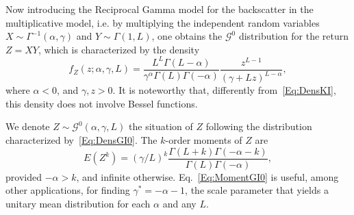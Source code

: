 \documentclass{beamer}
\begin{document}
\begin{frame}
Now introducing the Reciprocal Gamma model for the backscatter in the multiplicative model, i.e. by multiplying the independent random variables $X\sim{\Gamma^{-1}}(\alpha,\gamma)$ and $Y\sim\Gamma(1,L)$, one obtains the $\mathcal{G}^0$ distribution for the return $Z=XY$, which is characterized by the density
\begin{equation}
f_Z(z; \alpha,\gamma,L) = \frac{L^L \Gamma(L-\alpha)}{\gamma^\alpha \Gamma(L)\Gamma(-\alpha)} \frac{z^{L-1}}{(\gamma+L z)^{L-\alpha}},
\label{Eq:DensGI0}
\end{equation}
where $\alpha<0$, and $\gamma,z>0$.
It is noteworthy that, differently from~\eqref{Eq:DensKI}, this density does not involve Bessel functions.

We denote $Z\sim \mathcal G^0(\alpha,\gamma,L)$ the situation of $Z$ following the distribution characterized by~\eqref{Eq:DensGI0}.
The $k$-order moments of $Z$ are
\begin{equation}
E(Z^k) = (\gamma / L)^{k} \frac{\Gamma(L+k)\Gamma(-\alpha-k)}{\Gamma(L)\Gamma(-\alpha)},
\label{Eq:MomentGI0}
\end{equation}
provided $-\alpha>k$, and infinite otherwise.
Eq.~\eqref{Eq:MomentGI0} is useful, among other applications, for finding $\gamma^*=-\alpha-1$, the scale parameter that yields a unitary mean distribution for each $\alpha$ and any $L$.
\end{frame}
\end{document}
